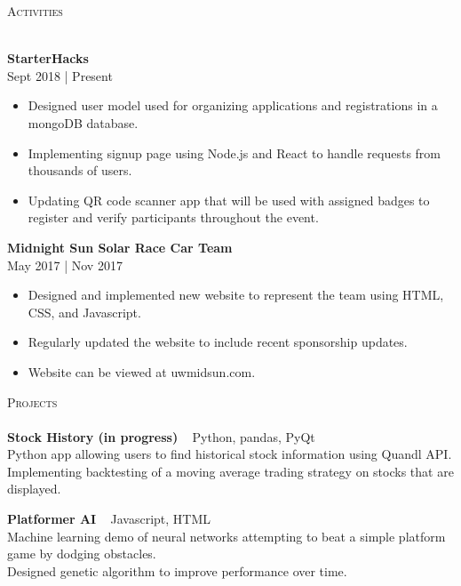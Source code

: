 \documentclass[a4paper]{article}
\newcommand{\lineunder} {
    \vspace*{-8pt} \\
    \hspace*{-18pt} \hrulefill \\
}
\newcommand{\header} [1] {
    {\hspace*{-18pt}\vspace*{6pt} \textsc{#1}}
    \vspace*{-6pt} \lineunder
}
\begin{document}
\header{Activities}
\vspace{1mm}

\textbf{StarterHacks} \hfill \\
 \hfill Sept 2018 | Present\\
\vspace{-1mm}
\begin{itemize} \itemsep 1pt
    \item Designed user model used for organizing applications and registrations in a mongoDB database.
    \item Implementing signup page using Node.js and React to handle requests from thousands of users.
    \item Updating QR code scanner app that will be used with assigned badges to register and verify participants throughout the event.
\end{itemize}

\textbf{Midnight Sun Solar Race Car Team}\\
 \hfill May 2017 | Nov 2017\\
\vspace{-1mm}
\begin{itemize} \itemsep 1pt
	\item Designed and implemented new website to represent the team using HTML, CSS, and Javascript.
	\item Regularly updated the website to include recent sponsorship updates.
	\item Website can be viewed at uwmidsun.com.
\end{itemize}

\header{Projects}
{\textbf{Stock History (in progress)}} {\ \textbar{} Python, pandas, PyQt } \\
Python app allowing users to find historical stock information using Quandl API.\\
Implementing backtesting of a moving average trading strategy on stocks that are displayed.\\
\vspace*{2mm}

{\textbf{Platformer AI}} {\ \textbar{} Javascript, HTML} \\
Machine learning demo of neural networks attempting to beat a simple platform game by dodging obstacles.\\
Designed genetic algorithm to improve performance over time.\\
\vspace*{2mm}
\end{document}
